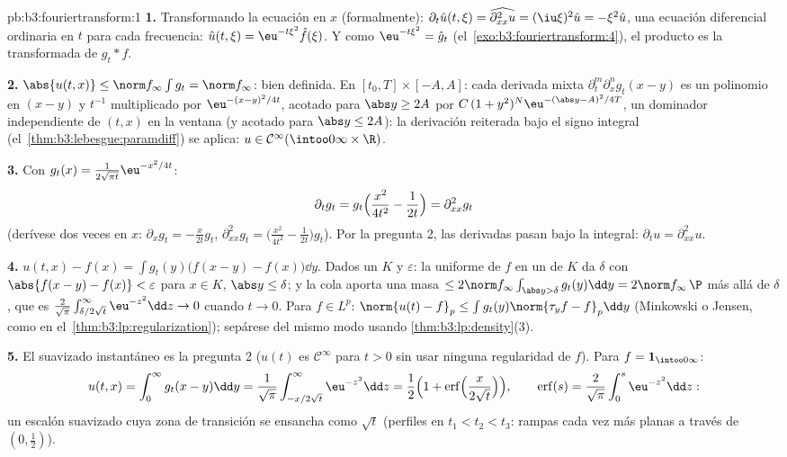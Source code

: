 \begin{solution}{pb:b3:fouriertransform:1}
\textbf{1.} Transformando la ecuación en $x$ (formalmente):
$\partial_t\hat u(t,\xi) = \widehat{\partial^2_{xx}u} =
(\iu\xi)^2\hat u = -\xi^2\hat u$, una ecuación diferencial ordinaria en
$t$ para cada frecuencia: $\hat u(t,\xi) = \eu^{-t\xi^2}\hat f(\xi)$. Y
como
$\eu^{-t\xi^2} = \hat g_t$
(el~\cref{exo:b3:fouriertransform:4}), el producto es la transformada de
$g_t * f$.

\textbf{2.} $\abs{u(t,x)} \leq \norm f_\infty\int g_t = \norm
f_\infty$: bien definida. En $[t_0, T]\times[-A, A]$: cada derivada
mixta $\partial^m_t\partial^n_xg_t(x - y)$ es un polinomio en $(x - y)$
y $t^{-1}$ multiplicado por $\eu^{-(x-y)^2/4t}$, acotado para
$\abs y \geq 2A$ por $C\,(1 + y^2)^N\eu^{-(\abs y - A)^2/4T}$, un
dominador  independiente de
$(t, x)$ en la ventana (y acotado para $\abs y \leq 2A$): la derivación
reiterada bajo el signo integral (el~\cref{thm:b3:lebesgue:paramdiff})
se aplica: $u \in
\mathcal C^\infty(\intoo0\infty\times\R)$.

\textbf{3.} Con $g_t(x) = \frac1{2\sqrt{\pi
t}}\eu^{-x^2/4t}$:
\[
\partial_tg_t = g_t\Bigl(\frac{x^2}{4t^2} - \frac1{2t}\Bigr)
= \partial^2_{xx}g_t
\]
(derívese dos veces en $x$: $\partial_xg_t = -\frac
x{2t}g_t$, $\partial^2_{xx}g_t = \bigl(\frac{x^2}{4t^2} -
\frac1{2t}\bigr)g_t$). Por la pregunta 2, las derivadas pasan bajo la
integral: $\partial_tu = \partial^2_{xx}u$.

\textbf{4.} $u(t,x) - f(x) = \int g_t(y)\bigl(f(x - y) -
f(x)\bigr)\dd y$. Dados un 
$K$ y $\varepsilon$: la 
uniforme de $f$ en un  de $K$
da $\delta$ con $\abs{f(x-y) - f(x)} < \varepsilon$ para $x \in
K$, $\abs y \leq \delta$; y la cola aporta una masa $\leq 2\norm
f_\infty\int_{\abs y > \delta}g_t(y)\dd y = 2\norm
f_\infty\,\P$ más allá de $\delta$, que es
$\frac2{\sqrt\pi}\int_{\delta/2\sqrt t}^\infty\eu^{-z^2}\dd z
\to 0$ cuando $t \to 0$. Para $f \in L^p$: $\norm{u(t) - f}_p \leq
\int g_t(y)\norm{\tau_yf - f}_p\dd y$ (Minkowski o Jensen, como en
el~\cref{thm:b3:lp:regularization}); sepárese del mismo modo usando
\cref{thm:b3:lp:density}(3).

\textbf{5.} El suavizado instantáneo es la pregunta 2 ($u(t)$ es
$\mathcal C^\infty$ para $t > 0$ sin usar ninguna regularidad de $f$).
Para $f = \mathbf 1_{\intoo0\infty}$:
\[
u(t, x) = \int_0^\infty g_t(x - y)\dd y
= \frac1{\sqrt\pi}\int_{-x/2\sqrt t}^{\infty}\eu^{-z^2}\dd z
= \frac12\Bigl(1 +
\operatorname{erf}\Bigl(\frac{x}{2\sqrt t}\Bigr)\Bigr),
\qquad \operatorname{erf}(s) =
\frac2{\sqrt\pi}\int_0^s\eu^{-z^2}\dd z :
\]
un escalón suavizado cuya zona de transición se ensancha como $\sqrt t$
(perfiles en $t_1 < t_2 < t_3$: rampas cada vez más planas a través de
$(0, \frac12)$).


\end{solution}
